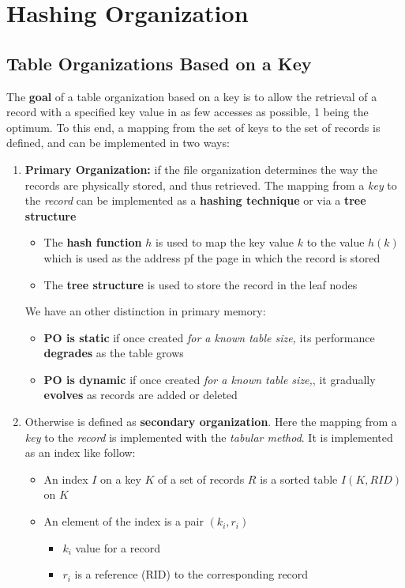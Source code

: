 \chapter{Hashing Organization}

\section{Table Organizations Based on a Key}
The \textbf{goal} of a table organization based on a key is to allow the retrieval of a record with a specified key value in as few accesses as possible, 1 being the optimum. To
this end, a mapping from the set of keys to the set of records is defined, and can be implemented in two ways:
\begin{enumerate}
    \item \textbf{Primary Organization:} if the file organization determines the way the records are physically stored, and thus retrieved. The mapping from a \textit{key} to the \textit{record} can be implemented as a \textbf{hashing technique} or via a \textbf{tree structure}
    \begin{itemize}
        \item The \textbf{hash function} \(h\) is used to map the key value \(k\) to the value \(h(k)\) which is used as the address pf the page in which the record is stored
        \item The \textbf{tree structure} is used to store the record in the leaf nodes
    \end{itemize}
    We have an other distinction in primary memory:
    \begin{itemize}
        \item \textbf{PO is static} if once created \textit{for a known table size,} its performance \textbf{degrades} as the table grows
        \item \textbf{PO is dynamic} if once created \textit{for a known table size,}, it gradually \textbf{evolves} as records are added or deleted
    \end{itemize}
    \item Otherwise is defined as \textbf{secondary organization}. Here the mapping from a \textit{key} to the \textit{record} is implemented with the \textit{tabular method}. It is implemented as an index like follow:
    \begin{itemize}
        \item An index \(I\) on a key \(K\) of a set of records \(R\) is a sorted table \(I(K, RID)\) on \(K\)
        \item An element of the index is a pair \((k_i, r_i)\)
        \begin{itemize}
            \item \(k_i\) value for a record
            \item \(r_i\) is a reference (RID) to the corresponding record
        \end{itemize}
    \end{itemize}
\end{enumerate}


